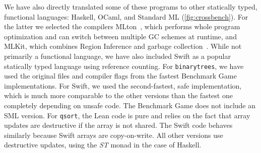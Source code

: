 We have also directly translated some of these programs to other statically
typed, functional languages: Haskell, OCaml, and Standard ML (\cref{fig:crossbench}).
For the latter we selected the compilers MLton~\cite{Weeks:2006:WCM:1159876.1159877},
which performs whole program optimization and can switch between multiple GC schemes at runtime,
and MLKit, which combines Region Inference and garbage collection~\cite{het02}.
While not primarily a functional language, we have also included Swift as a
popular statically typed language using reference counting.
For \verb!binarytrees!, we have used the original files and compiler flags from the fastest Benchmark
Game implementations. For Swift, we used the second-fastest, safe
implementation, which is much more comparable to the other versions than the
fastest one completely depending on unsafe code. The Benchmark Game does not include an SML version.
For \verb!qsort!, the Lean code is pure and relies on the fact that array
updates are destructive if the array is not shared. The Swift code behaves
similarly because Swift arrays are copy-on-write.
All other versions use destructive updates, using the \textit{ST} monad in the case of Haskell.

